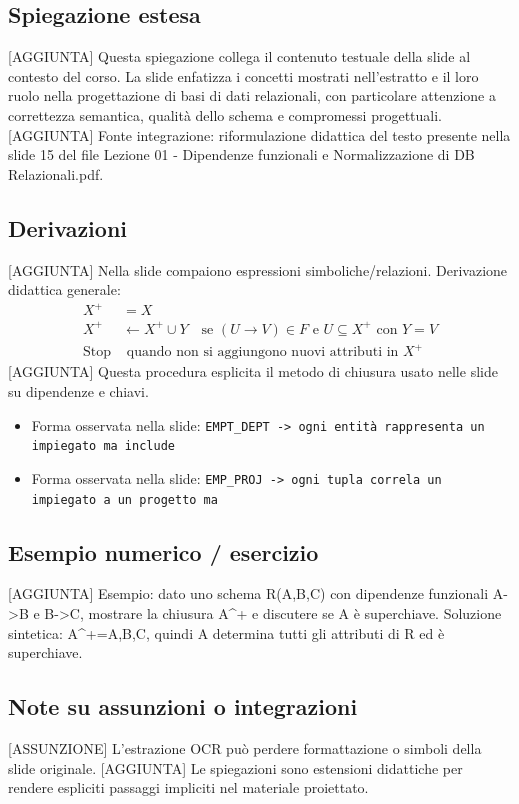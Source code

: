 \documentclass[11pt]{article}
\begin{document}
\subsection*{Spiegazione estesa}
[AGGIUNTA] Questa spiegazione collega il contenuto testuale della slide al contesto del corso. La slide enfatizza i concetti mostrati nell'estratto e il loro ruolo nella progettazione di basi di dati relazionali, con particolare attenzione a correttezza semantica, qualità dello schema e compromessi progettuali.
[AGGIUNTA] Fonte integrazione: riformulazione didattica del testo presente nella slide 15 del file Lezione 01 - Dipendenze funzionali e Normalizzazione di DB Relazionali.pdf.
\subsection*{Derivazioni}
[AGGIUNTA] Nella slide compaiono espressioni simboliche/relazioni. Derivazione didattica generale:
\begin{align*}
X^+ &= X \\
X^+ &\leftarrow X^+ \cup Y \quad \text{se } (U \to V) \in F \text{ e } U \subseteq X^+ \text{ con } Y=V \\
\text{Stop} &\text{ quando non si aggiungono nuovi attributi in } X^+
\end{align*}
[AGGIUNTA] Questa procedura esplicita il metodo di chiusura usato nelle slide su dipendenze e chiavi.
\begin{itemize}[leftmargin=*]
\item Forma osservata nella slide: \texttt{EMPT\_DEPT -> ogni entità rappresenta un impiegato ma include}
\item Forma osservata nella slide: \texttt{EMP\_PROJ -> ogni tupla correla un impiegato a un progetto ma}
\end{itemize}
\subsection*{Esempio numerico / esercizio}
[AGGIUNTA] Esempio: dato uno schema R(A,B,C) con dipendenze funzionali A->B e B->C, mostrare la chiusura A^+ e discutere se A è superchiave. Soluzione sintetica: A^+={A,B,C}, quindi A determina tutti gli attributi di R ed è superchiave.
\subsection*{Note su assunzioni o integrazioni}
[ASSUNZIONE] L'estrazione OCR può perdere formattazione o simboli della slide originale.
[AGGIUNTA] Le spiegazioni sono estensioni didattiche per rendere espliciti passaggi impliciti nel materiale proiettato.
\end{document}
